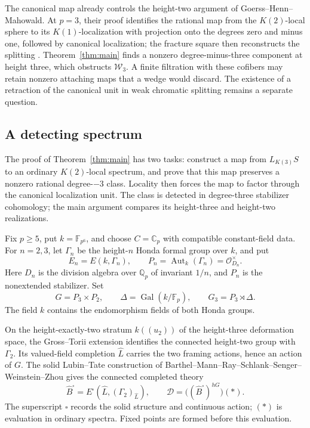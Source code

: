 \documentclass[11pt]{article}
\numberwithin{equation}{section}
\theoremstyle{definition}
\theoremstyle{remark}
\newcommand{\Q}{\mathbb Q}
\newcommand{\F}{\mathbb F}
\newcommand{\C}{\mathbb C}
\newcommand{\cO}{\mathcal O}
\DeclareMathOperator{\Gal}{Gal}
\DeclareMathOperator{\Aut}{Aut}
\begin{document}
The canonical map already controls the height-two argument of
Goerss--Henn--Mahowald. At \(p=3\), their proof identifies the rational
map from the \(K(2)\)-local sphere to its \(K(1)\)-localization with
projection onto the degrees zero and minus one, followed by canonical
localization; the fracture square then reconstructs the splitting
\cite[proof of Theorem~5.11, p.~1288]{GHM2014}.
Theorem~\ref{thm:main} finds a nonzero degree-minus-three component at
height three, which obstructs \(\mathcal W_3\). A finite filtration
with these cofibers may retain nonzero attaching maps that a wedge
would discard. The existence of a retraction of the canonical unit
in weak chromatic splitting remains a separate question.

\subsection{A detecting spectrum}

The proof of Theorem~\ref{thm:main} has two tasks: construct a map
from \(L_{K(3)}S\) to an ordinary \(K(2)\)-local spectrum, and prove
that this map preserves a nonzero rational degree-\(-3\) class. Locality
then forces the map to factor through the canonical localization unit.
The class is detected in degree-three stabilizer cohomology; the main
argument compares its height-three and height-two realizations.

Fix \(p\geq5\), put \(k=\F_{p^6}\), and choose \(C=\C_p\) with
compatible constant-field data. For \(n=2,3\), let \(\Gamma_n\) be the
height-\(n\) Honda formal group over \(k\), and put
\[
 E_n=E(k,\Gamma_n),\qquad
 P_n=\Aut_k(\Gamma_n)=\cO_{D_n}^{\times}.
\]
Here \(D_n\) is the division algebra over \(\Q_p\) of invariant
\(1/n\), and \(P_n\) is the nonextended stabilizer. Set
\[
 G=P_3\times P_2,\qquad
 \Delta=\Gal(k/\F_p),\qquad G_3=P_3\rtimes\Delta.
\]
The field \(k\) contains the endomorphism fields of both Honda groups.

On the height-exactly-two stratum \(k((u_2))\) of the height-three
deformation space, the Gross--Torii extension identifies the connected
height-two group with \(\Gamma_2\). Its valued-field completion
\(\widehat L\) carries the two framing actions, hence an action of
\(G\). The solid Lubin--Tate construction of
Barthel--Mann--Ray--Schlank--Senger--Weinstein--Zhou \cite{BMR2026}
gives the connected completed theory
\[
 \widehat B^\square=E^\square(\widehat L,(\Gamma_2)_{\widehat L}),
 \qquad \mathcal D=\bigl((\widehat B^\square)^{hG}\bigr)(*).
\]
The superscript \(\square\) records the solid structure and continuous
action; \((*)\) is evaluation in ordinary spectra. Fixed points are
formed before this evaluation.
\end{document}

